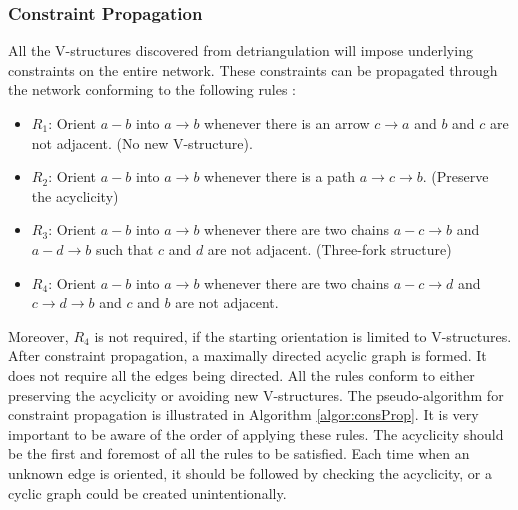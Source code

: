 \documentclass{article}
\begin{document}
\subsubsection{Constraint Propagation}
All the V-structures discovered from detriangulation will impose underlying constraints on the entire network. These constraints can be propagated through the network conforming to the following rules \cite{bkCausalityPearl}:
\vspace{-0.1in}
\begin{itemize}
\item $R_1$: Orient $a-b$ into $a\rightarrow b$ whenever there is an arrow $c\rightarrow a$ and $b$ and $c$ are not adjacent. (No new V-structure).
\vspace{-0.1in}
\item $R_2$: Orient $a-b$ into $a\rightarrow b$ whenever there is a path $a\rightarrow c \rightarrow b$. (Preserve the acyclicity)
\vspace{-0.1in}
\item $R_3$: Orient $a-b$ into $a\rightarrow b$ whenever there are two chains $a-c\rightarrow b$ and $a-d\rightarrow b$ such that $c$ and $d$ are not adjacent. (Three-fork structure)
\vspace{-0.1in}
\item $R_4$: Orient $a-b$ into $a\rightarrow b$ whenever there are two chains $a-c\rightarrow d$ and $c\rightarrow d \rightarrow b$ and $c$ and $b$ are not adjacent.
\vspace{-0.1in}
\end{itemize}  
%   
% 
Moreover, $R_4$ is not required, if the starting orientation is limited to V-structures. After constraint propagation, a maximally directed acyclic graph is formed. It does not require all the edges being directed. All the rules conform to either preserving the acyclicity or avoiding new V-structures. The pseudo-algorithm for constraint propagation is illustrated in Algorithm \ref{algor:consProp}.
%   
It is very important to be aware of the order of applying these rules. The acyclicity should be the first and foremost of all the rules to be satisfied. Each time when an unknown edge is oriented, it should be followed by checking the acyclicity, or a cyclic graph could be created unintentionally.

 
\end{document}
